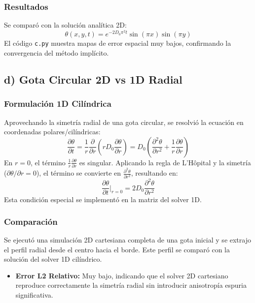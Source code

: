 \documentclass[a4paper,12pt]{article}
\begin{document}
\subsubsection*{Resultados}
Se comparó con la solución analítica 2D:
\begin{equation}
    \theta(x,y,t) = e^{-2 D_0 \pi^2 t} \sin(\pi x) \sin(\pi y)
\end{equation}
El código \texttt{c.py} muestra mapas de error espacial muy bajos, confirmando la convergencia del método implícito.

\subsection{d) Gota Circular 2D vs 1D Radial}

\subsubsection*{Formulación 1D Cilíndrica}
Aprovechando la simetría radial de una gota circular, se resolvió la ecuación en coordenadas polares/cilíndricas:
\begin{equation}
    \frac{\partial\theta}{\partial t} = \frac{1}{r} \frac{\partial}{\partial r} \left( r D_0 \frac{\partial\theta}{\partial r} \right) = D_0 \left( \frac{\partial^2\theta}{\partial r^2} + \frac{1}{r}\frac{\partial\theta}{\partial r} \right)
\end{equation}
En $r=0$, el término $\frac{1}{r}\frac{\partial\theta}{\partial r}$ es singular. Aplicando la regla de L'Hôpital y la simetría ($\partial\theta/\partial r = 0$), el término se convierte en $\frac{\partial^2\theta}{\partial r^2}$, resultando en:
\begin{equation}
    \frac{\partial\theta}{\partial t}\bigg|_{r=0} = 2 D_0 \frac{\partial^2\theta}{\partial r^2}
\end{equation}
Esta condición especial se implementó en la matriz del solver 1D.

\subsubsection*{Comparación}
Se ejecutó una simulación 2D cartesiana completa de una gota inicial y se extrajo el perfil radial desde el centro hacia el borde. Este perfil se comparó con la solución del solver 1D cilíndrico.
\begin{itemize}
    \item \textbf{Error L2 Relativo:} Muy bajo, indicando que el solver 2D cartesiano reproduce correctamente la simetría radial sin introducir anisotropía espuria significativa.
\end{itemize}
\end{document}
